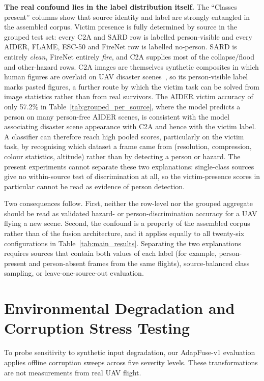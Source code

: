 \textbf{The real confound lies in the label distribution itself.} The ``Classes present'' columns show that source identity and label are strongly entangled in the assembled corpus. Victim presence is fully determined by source in the grouped test set: every C2A and SARD row is labelled person-visible and every AIDER, FLAME, ESC-50 and FireNet row is labelled no-person. SARD is entirely \emph{clean}, FireNet entirely \emph{fire}, and C2A supplies most of the collapse/flood and other-hazard rows. C2A images are themselves synthetic composites in which human figures are overlaid on UAV disaster scenes~\cite{nihal2024c2a}, so its person-visible label marks pasted figures, a further route by which the victim task can be solved from image statistics rather than from real survivors. The AIDER victim accuracy of only 57.2\% in Table~\ref{tab:grouped_per_source}, where the model predicts a person on many person-free AIDER scenes, is consistent with the model associating disaster scene appearance with C2A and hence with the victim label. A classifier can therefore reach high pooled scores, particularly on the victim task, by recognising which dataset a frame came from (resolution, compression, colour statistics, altitude) rather than by detecting a person or hazard. The present experiments cannot separate these two explanations: single-class sources give no within-source test of discrimination at all, so the victim-presence scores in particular cannot be read as evidence of person detection.

Two consequences follow. First, neither the row-level nor the grouped aggregate should be read as validated hazard- or person-discrimination accuracy for a UAV flying a new scene. Second, the confound is a property of the assembled corpus rather than of the fusion architecture, and it applies equally to all twenty-six configurations in Table~\ref{tab:main_results}. Separating the two explanations requires sources that contain both values of each label (for example, person-present and person-absent frames from the same flights), source-balanced class sampling, or leave-one-source-out evaluation.

\section{Environmental Degradation and Corruption Stress Testing}
\label{sec:robustness_stress_test}

To probe sensitivity to synthetic input degradation, our AdapFuse-v1 evaluation applies offline corruption sweeps across five severity levels. These transformations are not measurements from real UAV flight.

